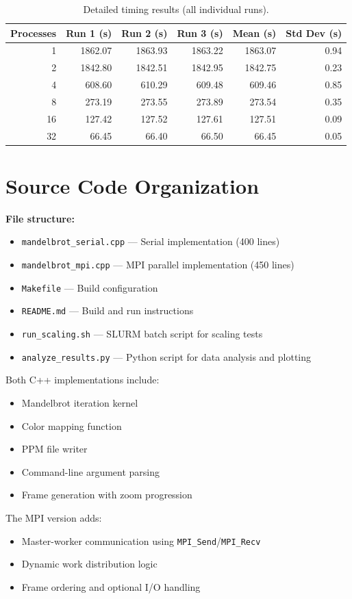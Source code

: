\documentclass[11pt,a4paper]{article}
\begin{document}
	\begin{table}[H]
		\centering
		\caption{Detailed timing results (all individual runs).}
		\label{table:timings_detailed}
		\begin{tabular}{rrrrrr}
			\toprule
			Processes & Run 1 (s) & Run 2 (s) & Run 3 (s) & Mean (s) & Std Dev (s) \\
			\midrule
			1  & 1862.07 & 1863.93 & 1863.22 & 1863.07 & 0.94 \\
			2  & 1842.80 & 1842.51 & 1842.95 & 1842.75 & 0.23 \\
			4  & 608.60  & 610.29  & 609.48  & 609.46  & 0.85 \\
			8  & 273.19  & 273.55  & 273.89  & 273.54  & 0.35 \\
			16 & 127.42  & 127.52  & 127.61  & 127.51  & 0.09 \\
			32 & 66.45   & 66.40   & 66.50   & 66.45   & 0.05 \\
			\bottomrule
		\end{tabular}
	\end{table}
	
	\section{Source Code Organization}
	
	\textbf{File structure:}
	\begin{itemize}
		\item \texttt{mandelbrot\_serial.cpp} — Serial implementation (400 lines)
		\item \texttt{mandelbrot\_mpi.cpp} — MPI parallel implementation (450 lines)
		\item \texttt{Makefile} — Build configuration
		\item \texttt{README.md} — Build and run instructions
		\item \texttt{run\_scaling.sh} — SLURM batch script for scaling tests
		\item \texttt{analyze\_results.py} — Python script for data analysis and plotting
	\end{itemize}
	
	Both C++ implementations include:
	\begin{itemize}
		\item Mandelbrot iteration kernel
		\item Color mapping function
		\item PPM file writer
		\item Command-line argument parsing
		\item Frame generation with zoom progression
	\end{itemize}
	
	The MPI version adds:
	\begin{itemize}
		\item Master-worker communication using \texttt{MPI\_Send}/\texttt{MPI\_Recv}
		\item Dynamic work distribution logic
		\item Frame ordering and optional I/O handling
	\end{itemize}
	
\end{document}
